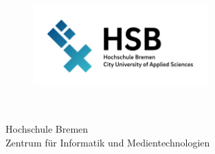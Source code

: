 \thispagestyle{empty}


\begin{figure}[t]
	\centering
	\includegraphics[width=0.6\textwidth]{abb/logo}
\end{figure}


\begin{verbatim}


\end{verbatim}

\begin{center}
	\Large{Hochschule Bremen}\\
	\Large{Zentrum für Informatik und Medientechnologien}\\
\end{center}


